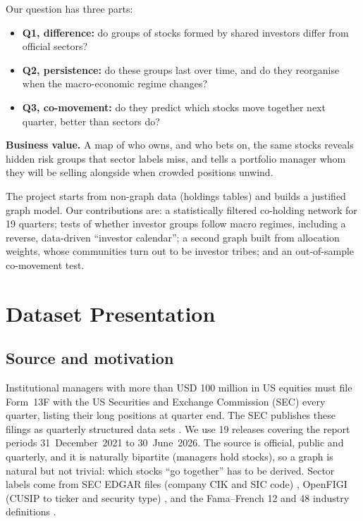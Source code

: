 \documentclass[10pt,a4paper]{article}
\begin{document}
Our question has three parts:
\begin{itemize}
  \item \textbf{Q1, difference:} do groups of stocks formed by shared investors differ from official sectors?
  \item \textbf{Q2, persistence:} do these groups last over time, and do they reorganise when the macro-economic regime changes?
  \item \textbf{Q3, co-movement:} do they predict which stocks move together next quarter, better than sectors do?
\end{itemize}
\noindent\textbf{Business value.} A map of who owns, and who bets on, the same stocks reveals hidden risk groups that sector labels miss, and tells a portfolio manager whom they will be selling alongside when crowded positions unwind.

The project starts from non-graph data (holdings tables) and builds a justified graph model. Our contributions are: a statistically filtered co-holding network for 19 quarters; tests of whether investor groups follow macro regimes, including a reverse, data-driven ``investor calendar''; a second graph built from allocation weights, whose communities turn out to be investor tribes; and an out-of-sample co-movement test.

\section{Dataset Presentation}
\subsection{Source and motivation}
Institutional managers with more than USD 100 million in US equities must file Form~13F with the US Securities and Exchange Commission (SEC) every quarter, listing their long positions at quarter end. The SEC publishes these filings as quarterly structured data sets \cite{sec13f}. We use 19 releases covering the report periods 31~December~2021 to 30~June~2026. The source is official, public and quarterly, and it is naturally bipartite (managers hold stocks), so a graph is natural but not trivial: which stocks ``go together'' has to be derived. Sector labels come from SEC EDGAR files (company CIK and SIC code) \cite{secedgar}, OpenFIGI (CUSIP to ticker and security type) \cite{openfigi}, and the Fama--French 12 and 48 industry definitions \cite{frenchlib}.
\end{document}
